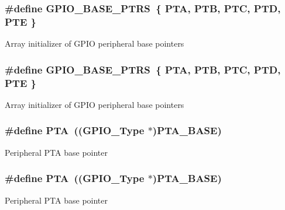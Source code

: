 \subsubsection[{\texorpdfstring{G\+P\+I\+O\+\_\+\+B\+A\+S\+E\+\_\+\+P\+T\+RS}{GPIO_BASE_PTRS}}]{\setlength{\rightskip}{0pt plus 5cm}\#define G\+P\+I\+O\+\_\+\+B\+A\+S\+E\+\_\+\+P\+T\+RS~\{ {\bf P\+TA}, {\bf P\+TB}, {\bf P\+TC}, {\bf P\+TD}, {\bf P\+TE} \}}\hypertarget{group__GPIO__Peripheral__Access__Layer_gad0f7206167a584b1e75a81a5c30fa1c2}{}\label{group__GPIO__Peripheral__Access__Layer_gad0f7206167a584b1e75a81a5c30fa1c2}
Array initializer of G\+P\+IO peripheral base pointers 
\subsubsection[{\texorpdfstring{G\+P\+I\+O\+\_\+\+B\+A\+S\+E\+\_\+\+P\+T\+RS}{GPIO_BASE_PTRS}}]{\setlength{\rightskip}{0pt plus 5cm}\#define G\+P\+I\+O\+\_\+\+B\+A\+S\+E\+\_\+\+P\+T\+RS~\{ {\bf P\+TA}, {\bf P\+TB}, {\bf P\+TC}, {\bf P\+TD}, {\bf P\+TE} \}}\hypertarget{group__GPIO__Peripheral__Access__Layer_gad0f7206167a584b1e75a81a5c30fa1c2}{}\label{group__GPIO__Peripheral__Access__Layer_gad0f7206167a584b1e75a81a5c30fa1c2}
Array initializer of G\+P\+IO peripheral base pointers 
\subsubsection[{\texorpdfstring{P\+TA}{PTA}}]{\setlength{\rightskip}{0pt plus 5cm}\#define P\+TA~(({\bf G\+P\+I\+O\+\_\+\+Type} $\ast$){\bf P\+T\+A\+\_\+\+B\+A\+SE})}\hypertarget{group__GPIO__Peripheral__Access__Layer_ga953adcb40e14085a9ffd1aa0ae40084b}{}\label{group__GPIO__Peripheral__Access__Layer_ga953adcb40e14085a9ffd1aa0ae40084b}
Peripheral P\+TA base pointer 
\subsubsection[{\texorpdfstring{P\+TA}{PTA}}]{\setlength{\rightskip}{0pt plus 5cm}\#define P\+TA~(({\bf G\+P\+I\+O\+\_\+\+Type} $\ast$){\bf P\+T\+A\+\_\+\+B\+A\+SE})}\hypertarget{group__GPIO__Peripheral__Access__Layer_ga953adcb40e14085a9ffd1aa0ae40084b}{}\label{group__GPIO__Peripheral__Access__Layer_ga953adcb40e14085a9ffd1aa0ae40084b}
Peripheral P\+TA base pointer 

